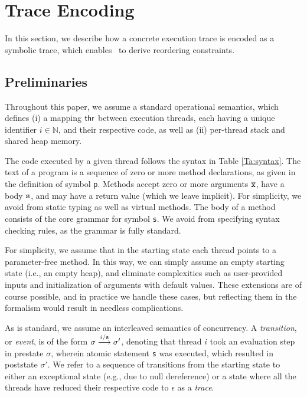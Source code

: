 \section{Trace Encoding}

In this section, we describe how a concrete execution trace is encoded as a symbolic trace, which enables \tool\ to 
derive reordering constraints.

\subsection{Preliminaries}

Throughout this paper, we assume a standard operational semantics, which defines (i) a mapping ${\sf thr}$ between
execution threads, each having a unique identifier $i \in \mathbb{N}$, and their respective code, as well as (ii) per-thread stack and shared heap memory. 

The code executed by a given thread follows the syntax in Table \ref{Ta:syntax}. The text of a program is a sequence of zero or more method declarations, as given in the definition of symbol {\tt p}. Methods accept zero or more arguments $\overline{{\tt x}}$, have a body ${\tt s}$, and may have a return value (which we leave implicit). For simplicity, we avoid from static typing as well as virtual methods. The body of a method consists of the core grammar for symbol {\tt s}. We avoid from specifying syntax checking rules, as the grammar is fully standard.

For simplicity, we assume that in the starting state each thread points to a parameter-free method. In this way, we can simply assume an empty starting state (i.e., an empty heap), and eliminate complexities such as user-provided inputs and initialization of arguments with default values. These extensions are of course possible, and in practice we handle these cases, but reflecting them in the formalism would result in needless complications.

As is standard, we assume an interleaved semantics of concurrency. A \emph{transition}, or \emph{event}, is of the form
$\sigma \stackrel{i / {\tt s}}{\longrightarrow} \sigma'$, denoting that thread $i$ took an evaluation step
in prestate $\sigma$, wherein atomic
statement {\tt s} was executed, which resulted in poststate $\sigma'$. We refer to a sequence of transitions from
the starting state to either an exceptional state (e.g., due to null dereference) or a state where all the threads have 
reduced their respective code to $\epsilon$ as a \emph{trace}.

